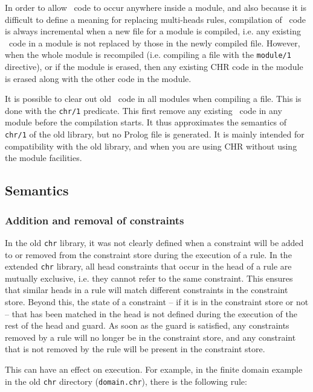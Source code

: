In order to allow \chr\  code to occur anywhere inside a module, and also 
because it is difficult to define a meaning for replacing multi-heads rules,
compilation of \chr\  code is always incremental when a new file for a
module is compiled, i.e. any existing \chr\ 
code in a module is not replaced by those in the newly compiled
file. However, when the whole module is recompiled  (i.e. compiling a file
with the \verb'module/1' directive), or if the module is erased,  then any 
existing CHR code in the module is erased along with the other code in the 
module.

It is possible to clear out old \chr\  code in all modules when compiling a 
file. This is done
with the {\tt chr/1} predicate. This first remove any existing \chr\  code in
any module before the compilation starts. It thus approximates the semantics
of {\tt chr/1} of the old library, but no Prolog file is generated. It is
mainly intended for compatibility with the old library, and when you are
using CHR without using the module facilities.

\subsection{Semantics}

\subsubsection{Addition and removal of constraints}

In the old {\tt chr} library, it was not clearly defined when a constraint
will be added to or removed from the constraint store during the execution of 
a rule.
In the extended {\tt chr} library, all head constraints
that occur in the head of a rule are mutually exclusive, i.e. they cannot
refer to the same constraint. This ensures that similar heads in a rule
will match different constraints in the constraint store.
Beyond this, the state of a constraint -- if it 
is in the constraint store or not -- that has been matched in the head 
is not defined during the execution of the rest of the head and guard.
As soon as the guard is satisfied, any constraints removed by a rule will
no longer be in the constraint store, and any constraint that is not
removed by the rule will be present in the constraint store.

This can have an effect on execution. For example, in the finite domain
example in the old {\tt chr} directory ({\tt domain.chr}), there is the following rule:

